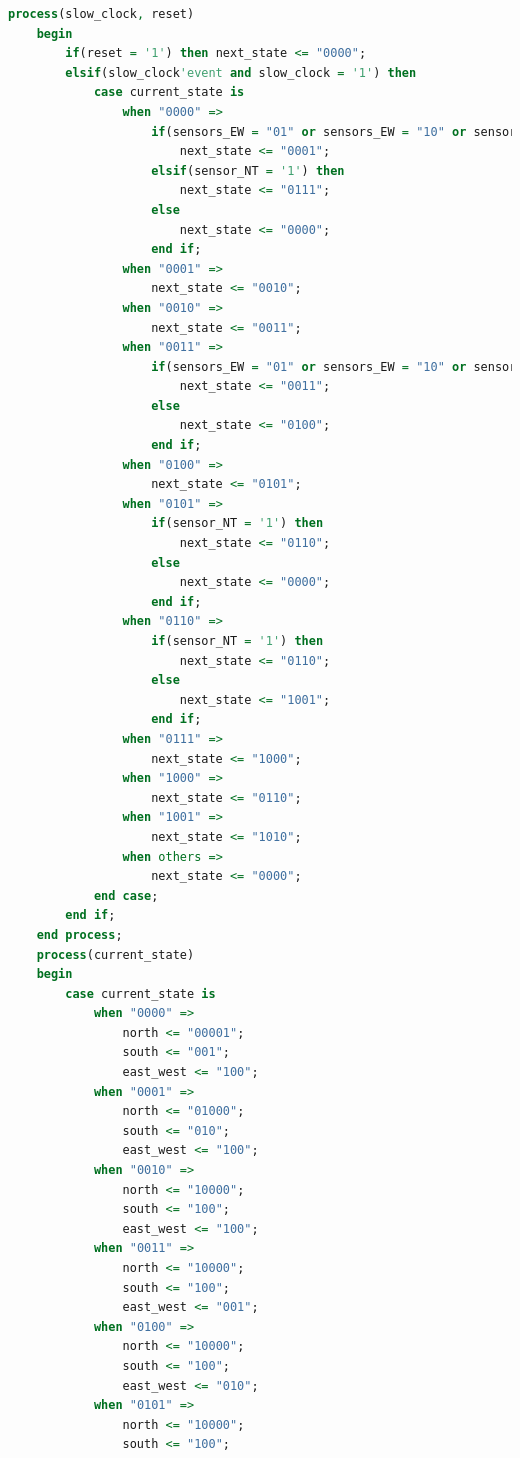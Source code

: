 \documentclass[11pt]{article}
\begin{document}
\begin{appendices}
\begin{lstlisting}[language=VHDL]
    process(slow_clock, reset)
    begin
        if(reset = '1') then next_state <= "0000";
        elsif(slow_clock'event and slow_clock = '1') then
            case current_state is
                when "0000" =>
                    if(sensors_EW = "01" or sensors_EW = "10" or sensors_EW = "11") then
                        next_state <= "0001";
                    elsif(sensor_NT = '1') then 
                        next_state <= "0111";
                    else
                        next_state <= "0000";
                    end if;
                when "0001" =>
                    next_state <= "0010";
                when "0010" =>
                    next_state <= "0011";
                when "0011" =>
                    if(sensors_EW = "01" or sensors_EW = "10" or sensors_EW = "11") then
                        next_state <= "0011";
                    else
                        next_state <= "0100";
                    end if;
                when "0100" =>
                    next_state <= "0101";
                when "0101" =>
                    if(sensor_NT = '1') then
                        next_state <= "0110";
                    else
                        next_state <= "0000";
                    end if;
                when "0110" =>
                    if(sensor_NT = '1') then
                        next_state <= "0110";
                    else
                        next_state <= "1001";
                    end if;
                when "0111" =>
                    next_state <= "1000";
                when "1000" =>
                    next_state <= "0110";
                when "1001" =>
                    next_state <= "1010";
                when others =>
                    next_state <= "0000";
            end case;
        end if;
    end process;
    process(current_state)
    begin
        case current_state is
            when "0000" =>
                north <= "00001";
                south <= "001";
                east_west <= "100";
            when "0001" =>
                north <= "01000";
                south <= "010";
                east_west <= "100";
            when "0010" =>
                north <= "10000";
                south <= "100";
                east_west <= "100";
            when "0011" =>
                north <= "10000";
                south <= "100";
                east_west <= "001";
            when "0100" =>
                north <= "10000";
                south <= "100";
                east_west <= "010";
            when "0101" =>
                north <= "10000";
                south <= "100";

\end{lstlisting}
\end{appendices}
\end{document}
